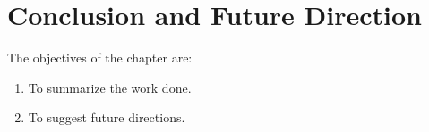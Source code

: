 \chapter{Conclusion and Future Direction}


\label{Chapter6} %

The objectives of the chapter are:

\begin{enumerate}
    \item To summarize the work done.
    \item To suggest future directions.
    
\end{enumerate}
